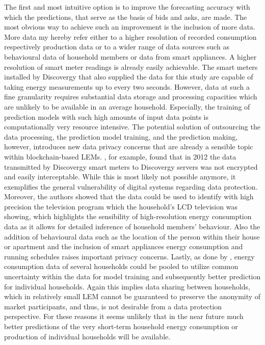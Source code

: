 The first and most intuitive option is to improve the forecasting accuracy with which the predictions, that serve as the basis of bids and asks, are made. The most obvious way to achieve such an improvement is the inclusion of more data. More data my hereby refer either to a higher resolution of recorded consumption respectively production data or to a wider range of data sources such as behavioural data of household members or data from smart appliances. A higher resolution of smart meter readings is already easily achievable. The smart meters installed by Discovergy that also supplied the data for this study are capable of taking energy measurements up to every two seconds. However, data at such a fine granularity requires substantial data storage and processing capacities which are unlikely to be available in an average household. Especially, the training of prediction models with such high amounts of input data points is computationally very resource intensive. The potential solution of outsourcing the data processing, the prediction model training, and the prediction making, however, introduces new data privacy concerns that are already a sensible topic within blockchain-based LEMs. \citet{Greveler:2012}, for example, found that in 2012 the data transmitted by Discovergy smart meters to Discovergy servers was not encrypted and easily interceptable. While this is most likely not possible anymore, it exemplifies the general vulnerability of digital systems regarding data protection. Moreover, the authors showed that the data could be used to identify with high precision the television program which the household's LCD television was showing, which highlights the sensibility of high-resolution energy consumption data as it allows for detailed inference of household members' behaviour. Also the addition of behavioural data such as the location of the person within their house or  apartment and the inclusion of smart appliances energy consumption and running schedules raises important privacy concerns. Lastly, as done by \citet{Shi:2017}, energy consumption data of several households could be pooled to utilize common uncertainty within the data for model training and subsequently better prediction for individual households. Again this implies data sharing between households, which in relatively small LEM cannot be guaranteed to preserve the anonymity of market participants, and thus, is not desirable from a data protection perspective. For these reasons it seems unlikely that in the near future much better predictions of the very short-term household energy consumption or production of individual households will be available.


